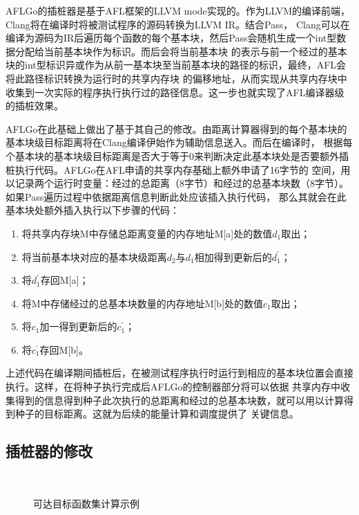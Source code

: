 \documentclass[bachelor]{njupthesis}
\begin{document}
AFLGo的插桩器是基于AFL框架的LLVM mode实现的。作为LLVM的编译前端，Clang将在编译时将被测试程序的源码转换为LLVM IR。结合Pass，
Clang可以在编译为源码为IR后遍历每个函数的每个基本块，然后Pass会随机生成一个int型数据分配给当前基本块作为标识。而后会将当前基本块
的表示与前一个经过的基本块的int型标识异或作为从前一基本块至当前基本块的路径的标识，最终，AFL会将此路径标识转换为运行时的共享内存块
的偏移地址，从而实现从共享内存块中收集到一次实际的程序执行执行过的路径信息。这一步也就实现了AFL编译器级的插桩效果。

AFLGo在此基础上做出了基于其自己的修改。由距离计算器得到的每个基本块的基本块级目标距离将在Clang编译伊始作为辅助信息送入。而后在编译时，
根据每个基本块的基本块级目标距离是否大于等于0来判断决定此基本块处是否要额外插桩执行代码。AFLGo在AFL申请的共享内存基础上额外申请了16字节的
空间，用以记录两个运行时变量：经过的总距离（8字节）和经过的总基本块数（8字节）。如果Pass遍历过程中依据距离信息判断此处应该插入执行代码，
那么其就会在此基本块处额外插入执行以下步骤的代码：
\begin{enumerate}[label=(\arabic*),leftmargin=48pt]
	\item 将共享内存块M中存储总距离变量的内存地址M[a]处的数值$d_1$取出；
	\item 将当前基本块对应的基本块级距离$d_2$与$d_1$相加得到更新后的$d_1^\prime$；
	\item 将$d_1^\prime$存回M[a]；
	\item 将M中存储经过的总基本块数量的内存地址M[b]处的数值$c_1$取出；
	\item 将$c_1$加一得到更新后的$c_1^\prime$；
	\item 将$c_1^\prime$存回M[b]。 
\end{enumerate}

上述代码在编译期间插桩后，在被测试程序执行时运行到相应的基本块位置会直接执行。这样，在将种子执行完成后AFLGo的控制器部分将可以依据
共享内存中收集得到的信息得到种子此次执行的总距离和经过的总基本块数，就可以用以计算得到种子的目标距离。这就为后续的能量计算和调度提供了
关键信息。
\subsection{插桩器的修改}
\begin{figure}[htb]
	\\
	\caption{可达目标函数集计算示例}
 	\label{pic:fc}
\end{figure}
\end{document}
